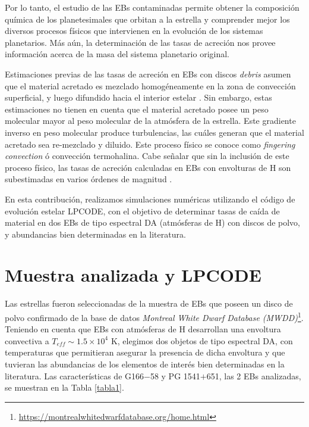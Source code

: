 \documentclass[baaa]{baaa}
\begin{document}
Por lo tanto, el estudio de las EBs contaminadas permite obtener la composición química de los planetesimales que orbitan a la estrella y comprender mejor los diversos procesos físicos que intervienen en la evolución de los sistemas planetarios. Más aún, la determinación de las tasas de acreción nos provee información acerca de la masa del sistema planetario original.

Estimaciones previas de las tasas de acreción en EBs con discos {\em debris} asumen que el material acretado es mezclado homogéneamente en la zona de convección superficial, y luego difundido hacia el interior estelar \citep[{\em Mixing Length Theory, } ][] {1992ApJS...82..505D,2012MNRAS.424..464F,2014A&A...566A..34K}. Sin embargo, estas estimaciones no tienen en cuenta que el material acretado posee un peso molecular mayor al peso molecular de la atmósfera de la estrella. Este gradiente inverso en peso molecular produce turbulencias, las cuáles generan que el material acretado sea re-mezclado y diluido. Este proceso físico se conoce como {\em fingering convection} ó convección termohalina. Cabe señalar que sin la inclusión de este proceso físico, las tasas de acreción calculadas en EBs con envolturas de H son subestimadas en varios órdenes de magnitud \citep{2017A&A...601A..13W,2018ApJ...859L..19B,2019ApJ...872...96B}. 

En esta contribución, realizamos simulaciones numéricas utilizando el código de evolución estelar LPCODE, con el objetivo de determinar tasas de caída de material en dos EBs de tipo espectral DA (atmósferas de H) con discos de polvo, y abundancias bien determinadas en la literatura.

\section{Muestra analizada y LPCODE}

Las estrellas fueron seleccionadas de la muestra de EBs que poseen un disco de polvo confirmado de la base de datos {\em Montreal White Dwarf Database (MWDD)}\footnote{\url{https://montrealwhitedwarfdatabase.org/home.html}}. Teniendo en cuenta que EBs con atmósferas de H desarrollan una envoltura convectiva a $T_{eff} \sim 1.5 \times 10^4$ K, elegimos dos objetos de tipo espectral DA, con temperaturas que permitieran asegurar la presencia de dicha envoltura y que tuvieran las abundancias de los elementos de interés bien determinadas en la literatura. Las características de G166$-$58 y PG 1541$+$651, las 2 EBs analizadas, se muestran en la Tabla \ref{tabla1}.
\end{document}
